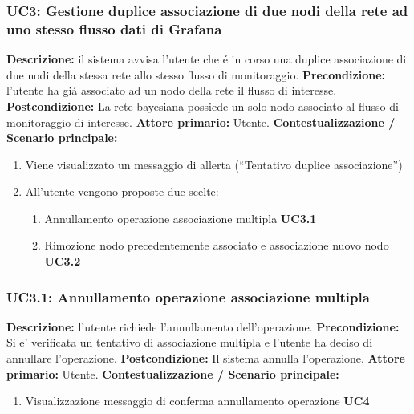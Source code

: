                 \subsubsection{UC3: Gestione duplice associazione di due nodi della rete ad uno stesso flusso dati di Grafana}
                    \textbf{Descrizione:} il sistema avvisa l’utente che é in corso una duplice associazione di due nodi della stessa rete allo stesso flusso di monitoraggio.
                    \newline
                    \textbf{Precondizione:} l’utente ha giá associato ad un nodo della rete il flusso di interesse.
                    \newline
                    \textbf{Postcondizione:}  La rete bayesiana possiede un solo nodo associato al flusso di monitoraggio di interesse.
                    \newline
                    \textbf{Attore primario:} Utente.
                    \newline
                    \textbf{Contestualizzazione / Scenario principale:} \begin{enumerate}
                        \item Viene visualizzato un messaggio di allerta (“Tentativo duplice associazione”)
                        \item All’utente vengono proposte due scelte:
                                \begin{enumerate}
                                    \item Annullamento operazione associazione multipla \textbf{UC3.1}
                                    \item Rimozione nodo precedentemente associato e associazione nuovo nodo \textbf{UC3.2}
                                \end{enumerate}
                    \end{enumerate}
                
                \subsubsection{UC3.1: Annullamento operazione associazione multipla}
                    \textbf{Descrizione:}  l’utente richiede l’annullamento dell’operazione.
                    \newline
                    \textbf{Precondizione:} Si e’ verificata un tentativo di associazione multipla e l’utente ha deciso di annullare l’operazione.
                    \newline
                    \textbf{Postcondizione:}  Il sistema annulla l’operazione.
                    \newline
                    \textbf{Attore primario:} Utente.
                    \newline
                    \textbf{Contestualizzazione / Scenario principale:} \begin{enumerate}
                        \item Visualizzazione messaggio di conferma annullamento operazione \textbf{UC4}
                    \end{enumerate}
                
